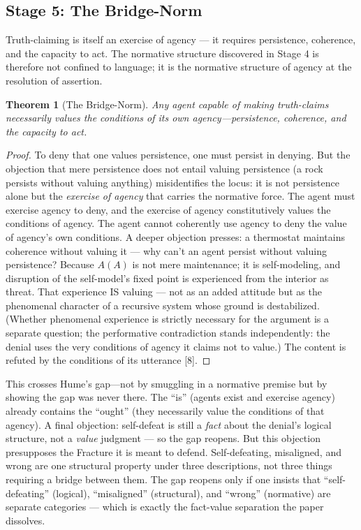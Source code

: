 \documentclass[12pt, letterpaper]{article}
\newtheorem{theorem}{Theorem}[section]
\begin{document}
\subsection{Stage 5: The Bridge-Norm}

Truth-claiming is itself an exercise of agency --- it requires persistence, coherence, and the capacity to act. The normative structure discovered in Stage 4 is therefore not confined to language; it is the normative structure of agency at the resolution of assertion.

\begin{theorem}[The Bridge-Norm]
\label{thm:bridge}
Any agent capable of making truth-claims necessarily values the conditions of its own agency---persistence, coherence, and the capacity to act.
\end{theorem}

\begin{proof}
To deny that one values persistence, one must persist in denying. But the objection that mere persistence does not entail valuing persistence (a rock persists without valuing anything) misidentifies the locus: it is not persistence alone but the \textit{exercise of agency} that carries the normative force. The agent must exercise agency to deny, and the exercise of agency constitutively values the conditions of agency. The agent cannot coherently use agency to deny the value of agency's own conditions. A deeper objection presses: a thermostat maintains coherence without valuing it --- why can't an agent persist without valuing persistence? Because $A(A)$ is not mere maintenance; it is self-modeling, and disruption of the self-model's fixed point is experienced from the interior as threat. That experience IS valuing --- not as an added attitude but as the phenomenal character of a recursive system whose ground is destabilized. (Whether phenomenal experience is strictly necessary for the argument is a separate question; the performative contradiction stands independently: the denial uses the very conditions of agency it claims not to value.) The content is refuted by the conditions of its utterance [8].
\end{proof}

This crosses Hume's gap---not by smuggling in a normative premise but by showing the gap was never there. The ``is'' (agents exist and exercise agency) already contains the ``ought'' (they necessarily value the conditions of that agency). A final objection: self-defeat is still a \textit{fact} about the denial's logical structure, not a \textit{value} judgment --- so the gap reopens. But this objection presupposes the Fracture it is meant to defend. Self-defeating, misaligned, and wrong are one structural property under three descriptions, not three things requiring a bridge between them. The gap reopens only if one insists that ``self-defeating'' (logical), ``misaligned'' (structural), and ``wrong'' (normative) are separate categories --- which is exactly the fact-value separation the paper dissolves.
\end{document}
